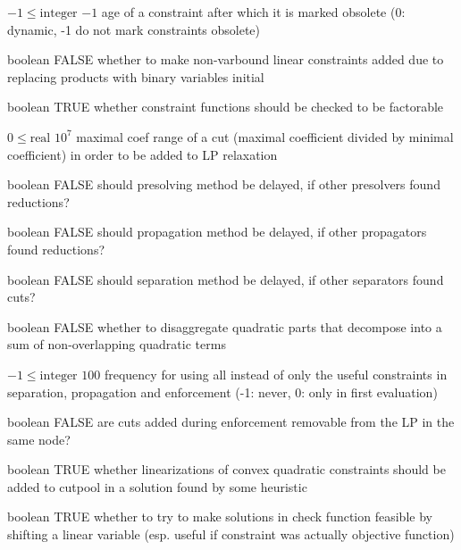%
{$-1\leq\textrm{integer}$}%
{$-1$}%
{age of a constraint after which it is marked obsolete (0: dynamic, -1 do not mark constraints obsolete)}%
{}

%
{boolean}%
{FALSE}%
{whether to make non-varbound linear constraints added due to replacing products with binary variables initial}%
{}

%
{boolean}%
{TRUE}%
{whether constraint functions should be checked to be factorable}%
{}

%
{$0\leq\textrm{real}$}%
{$10^{  7}$}%
{maximal coef range of a cut (maximal coefficient divided by minimal coefficient) in order to be added to LP relaxation}%
{}

%
{boolean}%
{FALSE}%
{should presolving method be delayed, if other presolvers found reductions?}%
{}

%
{boolean}%
{FALSE}%
{should propagation method be delayed, if other propagators found reductions?}%
{}

%
{boolean}%
{FALSE}%
{should separation method be delayed, if other separators found cuts?}%
{}

%
{boolean}%
{FALSE}%
{whether to disaggregate quadratic parts that decompose into a sum of non-overlapping quadratic terms}%
{}

%
{$-1\leq\textrm{integer}$}%
{$100$}%
{frequency for using all instead of only the useful constraints in separation, propagation and enforcement (-1: never, 0: only in first evaluation)}%
{}

%
{boolean}%
{FALSE}%
{are cuts added during enforcement removable from the LP in the same node?}%
{}

%
{boolean}%
{TRUE}%
{whether linearizations of convex quadratic constraints should be added to cutpool in a solution found by some heuristic}%
{}

%
{boolean}%
{TRUE}%
{whether to try to make solutions in check function feasible by shifting a linear variable (esp. useful if constraint was actually objective function)}%
{}

